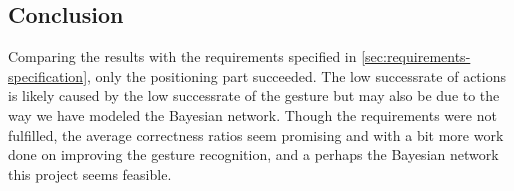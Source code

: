 \subsection{Conclusion}
\label{sec:evaluation:user-tests-conclusion}

Comparing the results with the requirements specified in \cref{sec:requirements-specification}, only the positioning part succeeded.
The low successrate of actions is likely caused by the low successrate of the gesture but may also be due to the way we have modeled the Bayesian network.
Though the requirements were not fulfilled, the average correctness ratios seem promising and with a bit more work done on improving the gesture recognition, and a perhaps the Bayesian network this project seems feasible.

